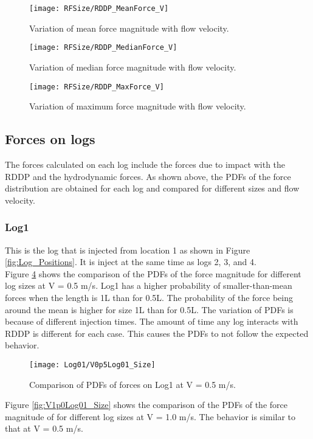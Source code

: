 \begin{figure}
\centering
\texttt{[image: RFSize/RDDP\_MeanForce\_V]}
\caption{\label{fig:RDDP_MeanForce_V}Variation of mean force magnitude with flow velocity.}
\end{figure}
\begin{figure}
\centering
\texttt{[image: RFSize/RDDP\_MedianForce\_V]}
\caption{\label{fig:RDDP_MeanForce_V}Variation of median force magnitude with flow velocity.}
\end{figure}
\begin{figure}
\centering
\texttt{[image: RFSize/RDDP\_MaxForce\_V]}
\caption{\label{fig:RDDP_MeanForce_V}Variation of maximum force magnitude with flow velocity.}
\end{figure}
\FloatBarrier
\subsection{Forces on logs}
The forces calculated on each log include the forces due to impact with the RDDP and the hydrodynamic forces. As shown above, the PDFs of the force distribution are obtained for each log and compared for different sizes and flow velocity. 
\FloatBarrier
\subsubsection{Log1}
This is the log that is injected from location 1 as shown in Figure \ref{fig:Log_Positions}. It is inject at the same time as logs 2, 3, and 4.\\ 
Figure \ref{fig:V0p5Log01_Size} shows the comparison of the PDFs of the force magnitude for different log sizes at V = 0.5 m/s. Log1  has a higher probability of smaller-than-mean forces when the length is 1L than for 0.5L. The probability of the force being around the mean is higher for size 1L than for 0.5L. The variation of PDFs is because of different injection times. The amount of time any log interacts with RDDP is different for each case. This causes the PDFs to not follow the expected behavior. %

\begin{figure}
\centering
\texttt{[image: Log01/V0p5Log01\_Size]}
\caption{\label{fig:V0p5Log01_Size}Comparison of PDFs of forces on Log1 at V = 0.5 m/s.}
\end{figure}

\noindent Figure \ref{fig:V1p0Log01_Size} shows the comparison of the PDFs of the force magnitude of for different log sizes at V = 1.0 m/s. The behavior is similar to that at V = 0.5 m/s.

